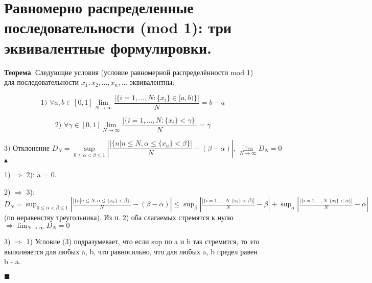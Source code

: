 \setcounter{section}{75}
\section{Равномерно распределенные последовательности (mod 1): три эквивалентные формулировки.}
\textbf{Теорема}. Следующие условия (условие равномерной распределённости mod 1) для последовательности $x_1, x_2, \dots, x_n, \dots$ эквивалентны: \par
\[ \text{1) } \forall a, b \in [0, 1] \lim_{N \to \infty} \frac{|\{i = 1, \dots, N: \{x_i\} \in [a, b)\}|}{N} = b - a \]

\[ \text{2) }\forall \gamma \in [0, 1] \lim_{N \to \infty} \frac{|\{i = 1, \dots, N: \{x_i\} < \gamma \}|}{N} = \gamma \] 

\[ \text{3) Отклонение }D_N = \sup_{0 \leqslant \alpha < \beta \leqslant 1}|\frac{|\{n | n \leqslant N, \alpha \leqslant \{x_n\} < \beta \}|}{N} - (\beta - \alpha)| \text{, } \lim_{N \to \infty}D_N = 0\]
$\blacktriangle$ \par
1) $\Rightarrow$ 2): a = 0. \par
2) $\Rightarrow$ 3): $D_N = \sup_{0 \leqslant \alpha < \beta \leqslant 1}|\frac{|\{n | n \leqslant N, \alpha \leqslant \{x_n\} < \beta \}|}{N} - (\beta - \alpha)| \leqslant \sup_{\beta}|\frac{|\{i = 1, \dots, N: \{x_i\} < \beta \}|}{N} - \beta| + \sup_{\alpha}|\frac{|\{i = 1, \dots, N: \{x_i\} < \alpha \}|}{N} - \alpha|$ (по неравенству треугольника). Из п. 2) оба слагаемых стремятся к нулю $\Rightarrow \lim_{N \to \infty}D_N = 0$ \par
3) $\Rightarrow$ 1) Условие (3) подразумевает, что если sup по a и b так стремится, то это выполняется для любых a, b, что равносильно, что для любых a, b предел равен b - a.

$\blacksquare$